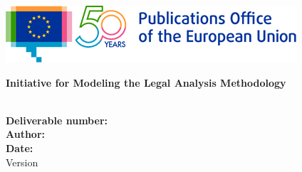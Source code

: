 \begin{center}
\vspace{1cm}

  \begin{center}


  \includegraphics[scale=.71]{images/logos/OP-50years-EN}
  \vspace{2mm}

  \end{center}
  \vspace{4cm}
  \textbf{{\large Initiative for Modeling the Legal Analysis Methodology\\}}
  \vspace{2cm}
  
  \begin{spacing}{2.5}
    \textbf{\Huge \DelTitle}\\ \vspace{2cm}
    \textbf{\large Deliverable number: \DelNumber} \\ %
	\textbf{\large Author: \DelAuthor} \\ %
	\textbf{\large Date: \DelDate} \\ %
    {\large Version \DelVersion}
  \end{spacing}
  
  \vspace*{\fill}


\end{center}

